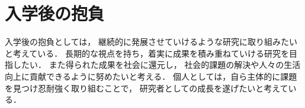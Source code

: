 \section{入学後の抱負}
  入学後の抱負としては，
  継続的に発展させていけるような研究に取り組みたいと考えている．
  長期的な視点を持ち，着実に成果を積み重ねていける研究を目指したい．
  また得られた成果を社会に還元し，
  社会的課題の解決や人々の生活向上に貢献できるように努めたいと考える．
  個人としては，自ら主体的に課題を見つけ忍耐強く取り組むことで，
  研究者としての成長を遂げたいと考えている．

